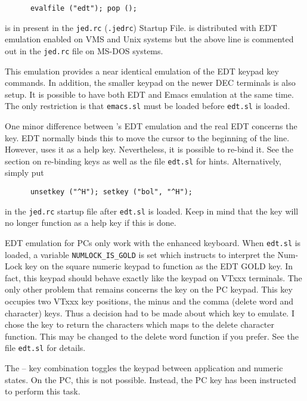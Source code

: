 \begin{verbatim}
      evalfile ("edt"); pop ();
\end{verbatim}


  is in present in the \verb|jed.rc| (\verb|.jedrc|) Startup File.  \jed{} is
  distributed with EDT emulation enabled on VMS and Unix systems but the
  above line is commented out in the \verb|jed.rc| file on MS-DOS systems.

  This emulation provides a near identical emulation of the EDT keypad key
  commands.  In addition, the smaller keypad on the newer DEC terminals is
  also setup.  It is possible to have both EDT and Emacs emulation at the
  same time.  The only restriction is that \verb|emacs.sl| must be loaded
  before \verb|edt.sl| is loaded.

  One minor difference between \jed{}'s EDT emulation and the real EDT concerns
  the  key.  EDT normally binds this to move the cursor to the
  beginning of the line.  However, \jed{} uses it as a help key. Nevertheless,
  it is possible to re-bind it.  See the section on re-binding keys as well as
  the file \verb|edt.sl| for hints.  Alternatively, simply put
\begin{verbatim}
      unsetkey ("^H"); setkey ("bol", "^H");
\end{verbatim}
  in the \verb|jed.rc| startup file after \verb|edt.sl| is loaded.  Keep in
  mind that the  key will no longer function as a help key if
  this is done.

  EDT emulation for PCs only work with the enhanced keyboard.  When
  \verb|edt.sl| is loaded, a variable \verb|NUMLOCK_IS_GOLD| is set which
  instructs \jed{} to interpret the Num-Lock key on the square numeric keypad to
  function as the EDT GOLD key.  In fact, this keypad should behave exactly
  like the keypad on VTxxx terminals.  The only other problem that remains
  concerns the \key{+} key on the PC keypad.  This key occupies two VTxxx
  key positions, the minus and the comma (delete word and character) keys.
  Thus a decision had to be made about which key to emulate.  I chose the
  \key{+} key to return the characters  which \jed{} maps
  to the delete character function.  This may be changed to the delete word
  function if you prefer.  See the file \verb|edt.sl| for details.

  The -- key combination toggles the keypad between
  application and numeric states.  On the PC, this is not possible. Instead,
  the PC  key has been instructed to perform this task.

